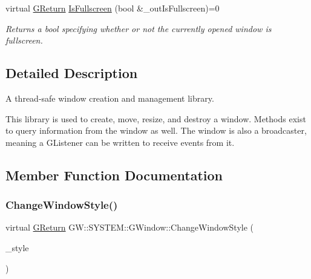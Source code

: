 \begin{DoxyCompactItemize}
$$virtual \hyperlink{namespaceGW_a67a839e3df7ea8a5c5686613a7a3de21}{G\+Return} \hyperlink{classGW_1_1SYSTEM_1_1GWindow_a28ae1c50fbd7c1c292ed5aa055cae9a7}{Is\+Fullscreen} (bool \&\+\_\+out\+Is\+Fullscreen)=0
\begin{DoxyCompactList}\small\item\em Returns a bool specifying whether or not the currently opened window is fullscreen. \end{DoxyCompactList}\end{DoxyCompactItemize}


\subsection{Detailed Description}
A thread-\/safe window creation and management library. 

This library is used to create, move, resize, and destroy a window. Methods exist to query information from the window as well. The window is also a broadcaster, meaning a G\+Listener can be written to receive events from it. 

\subsection{Member Function Documentation}
\mbox{\label{classGW_1_1SYSTEM_1_1GWindow_a21533c58e920d347c377ebdaa6d2b76f}} 
\subsubsection{\texorpdfstring{Change\+Window\+Style()}{ChangeWindowStyle()}}
{\footnotesize\ttfamily virtual \hyperlink{namespaceGW_a67a839e3df7ea8a5c5686613a7a3de21}{G\+Return} G\+W\+::\+S\+Y\+S\+T\+E\+M\+::\+G\+Window\+::\+Change\+Window\+Style (\begin{DoxyParamCaption}\item[{\hyperlink{namespaceGW_1_1SYSTEM_ad117891e556631f842625c348d36a071}{G\+Window\+Style}}]{\+\_\+style }\end{DoxyParamCaption})\hspace{0.3cm}{\ttfamily [pure virtual]}}



